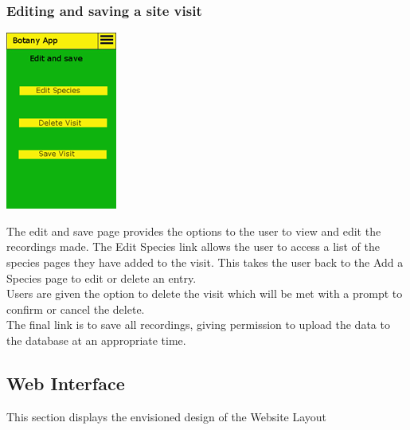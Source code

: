	\subsubsection{Editing and saving a site visit}
		\begin{center}
			\includegraphics[scale=0.5]{uiDesign/botanyAppEditSaveSiteVisit.png}
		\end{center}
		The edit and save page provides the options to the user to view and edit the recordings made. The Edit Species link allows the user to access a list of the species pages they have added to the visit. This takes the user back to the Add a Species page to edit or delete an entry.\\
		
		Users are given the option to delete the visit which will be met with a prompt to confirm or cancel the delete.\\

		The final link is to save all recordings, giving permission to upload the data to the database at an appropriate time.\\
		
	\subsection{Web Interface}
		This section displays the envisioned design of the Website Layout

